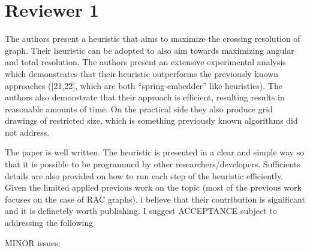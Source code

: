 \documentclass{article}
\begin{document}
\section*{Reviewer 1}

The authors present a heuristic that aims to maximize the crossing resolution of graph. Their heuristic can be adopted to also aim towards maximizing angular and total resolution. The authors present an extensive experimental analysis which demonstrates that their heuristic
outperforms the previously known approaches ([21,22], which are both ``spring-embedder'' like heuristics). The authors also demonstrate that their approach is efficient, resulting results in reasonable
amounts of time. On the practical side they also produce grid drawings of restricted size, which is something previously known algorithms did not address. 

The paper is well written. The heuristic is presented in a clear and simple way so that it is possible to be programmed by other researchers/developers. Sufficients details are also provided
on how to run each step of the heuristic efficiently. Given the limited applied previous work on the topic (most of the previous work focuses on the case of RAC graphs), i believe that their contribution is significant and it is definetely worth publishing. I suggest ACCEPTANCE subject to addressing the following 

MINOR issues:
\end{document}
